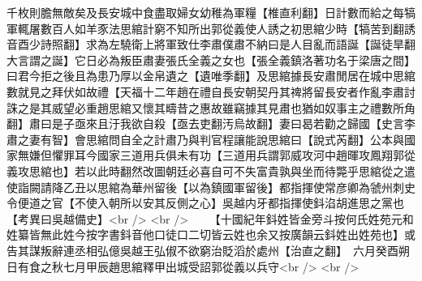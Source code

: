 千枚則膽無敵矣及長安城中食盡取婦女幼稚為軍糧【椎直利翻】日計數而給之每犒軍輒屠數百人如羊豕法思綰計窮不知所出郭從義使人誘之初思綰少時【犒苦到翻誘音酉少詩照翻】求為左驍衛上將軍致仕李肅僕肅不納曰是人目亂而語誕【誕徒旱翻大言謂之誕】它日必為叛臣肅妻張氏全義之女也【張全義鎮洛著功名于梁唐之間】曰君今拒之後且為患乃厚以金帛遺之【遺唯季翻】及思綰據長安肅閒居在城中思綰數就見之拜伏如故禮【天福十二年趙在禮自長安朝契丹其禆將留長安者作亂李肅討誅之是其威望必重趙思綰又懷其疇昔之惠故雖竊據其見肅也猶如奴事主之禮數所角翻】肅曰是子亟來且汙我欲自殺【亟去吏翻汚烏故翻】妻曰曷若勸之歸國【史言李肅之妻有智】會思綰問自全之計肅乃與判官程讓能說思綰曰【說式芮翻】公本與國家無嫌但懼罪耳今國家三道用兵俱未有功【三道用兵謂郭威攻河中趙暉攻鳳翔郭從義攻思綰也】若以此時翻然改圖朝廷必喜自可不失富貴孰與坐而待斃乎思綰從之遣使詣闕請降乙丑以思綰為華州留後【以為鎮國軍留後】都指揮使常彦卿為虢州刺史令便道之官【不使入朝所以安其反側之心】吳越内牙都指揮使鈄淊胡進思之黨也　【考異曰吳越備史】<br />
<br />
　　【十國紀年鈄姓皆金旁斗按何氏姓苑元和姓纂皆無此姓今按字書鈄音他口徒口二切皆云姓也余又按廣韻云鈄姓出姓苑也】或告其謀叛辭連丞相弘億吳越王弘俶不欲窮治貶滔於處州【治直之翻】　六月癸酉朔日有食之秋七月甲辰趙思綰釋甲出城受詔郭從義以兵守<br />
<br />
